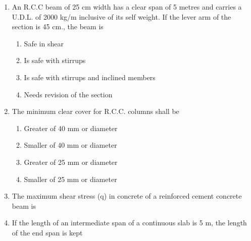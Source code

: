 \documentclass[11pt,a4paper]{article}
\begin{document}
\begin{enumerate}
\item{An R.C.C beam of 25 cm width has a clear span of 5 metres and carries a U.D.L. of 2000 kg/m inclusive of its self weight. If the lever arm of the section is 45 cm., the beam is}
\begin{enumerate}[label=\Alph*.]
\item{Safe in shear}
\item{Is safe with stirrups}
\item{Is safe with stirrups and inclined members}
\item{Needs revision of the section}
\end{enumerate}
\item{The minimum clear cover for R.C.C. columns shall be}
\begin{enumerate}[label=\Alph*.]
\item{Greater of 40 mm or diameter}
\item{Smaller of 40 mm or diameter}
\item{Greater of 25 mm or diameter}
\item{Smaller of 25 mm or diameter}
\end{enumerate}
\item{The maximum shear stress (q) in concrete of a reinforced cement concrete beam is}
\\
\item{If the length of an intermediate span of a continuous slab is 5 m, the length of the end span is kept}

\end{enumerate}
\end{document}
